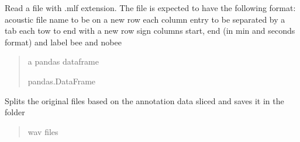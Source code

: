 \documentclass[letterpaper,10pt,english]{sphinxmanual}
\begin{document}
\begin{fulllineitems}
\begin{fulllineitems}
\end{fulllineitems}


\begin{fulllineitems}
\label{\detokenize{BeeData:BeeData.BeeData.mlf_data_read}}
\pysigstartsignatures
{}
\pysigstopsignatures
\sphinxAtStartPar
Read a file with .mlf extension. The file is expected to have the following format:
\sphinxhyphen{} acoustic file name to be on a new row
\sphinxhyphen{} each column entry to be separated by a tab
\sphinxhyphen{} each tow to end with a new row sign
\sphinxhyphen{} columns \sphinxhyphen{} start, end (in min and seconds format) and label \sphinxhyphen{}bee and nobee
\begin{quote}\begin{description}
\sphinxAtStartPar
a pandas dataframe

\sphinxAtStartPar
pandas.DataFrame

\end{description}\end{quote}

\end{fulllineitems}


\begin{fulllineitems}
\label{\detokenize{BeeData:BeeData.BeeData.split_acoustic_data_sliced}}
\pysigstartsignatures
{}
\pysigstopsignatures
\sphinxAtStartPar
Splits the original files based on the annotation data sliced and saves it in the folder
\begin{quote}\begin{description}
\sphinxAtStartPar
wav files

\end{description}\end{quote}

\end{fulllineitems}



\end{fulllineitems}
\end{document}
